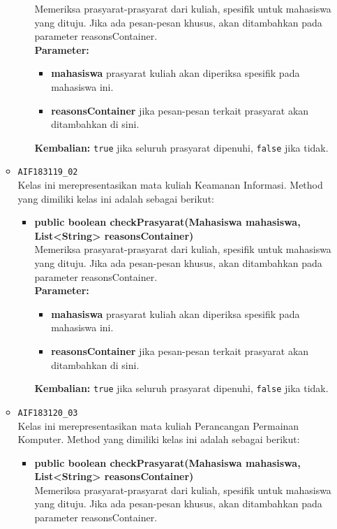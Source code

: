 \begin{enumerate}
\begin{itemize}
\begin{itemize}
			Memeriksa prasyarat-prasyarat dari kuliah, spesifik untuk mahasiswa yang dituju. Jika ada pesan-pesan khusus, akan ditambahkan pada parameter reasonsContainer.\\
			\textbf{Parameter:}
			\begin{itemize}
				\item \textbf{mahasiswa} prasyarat kuliah akan diperiksa spesifik pada mahasiswa ini.
				\item \textbf{reasonsContainer} jika pesan-pesan terkait prasyarat akan ditambahkan di sini.
			\end{itemize}
			\textbf{Kembalian:} \texttt{true} jika seluruh prasyarat dipenuhi, \texttt{false} jika tidak.
		\end{itemize}
		\item \texttt{AIF183119\_02} \\
		Kelas ini merepresentasikan mata kuliah Keamanan Informasi. Method yang dimiliki kelas ini adalah sebagai berikut: 
		\begin{itemize}
			\item \textbf{public boolean checkPrasyarat(Mahasiswa mahasiswa, List<String> reasonsContainer)}\\
			Memeriksa prasyarat-prasyarat dari kuliah, spesifik untuk mahasiswa yang dituju. Jika ada pesan-pesan khusus, akan ditambahkan pada parameter reasonsContainer.\\
			\textbf{Parameter:}
			\begin{itemize}
				\item \textbf{mahasiswa} prasyarat kuliah akan diperiksa spesifik pada mahasiswa ini.
				\item \textbf{reasonsContainer} jika pesan-pesan terkait prasyarat akan ditambahkan di sini.
			\end{itemize}
			\textbf{Kembalian:} \texttt{true} jika seluruh prasyarat dipenuhi, \texttt{false} jika tidak.
		\end{itemize}
		\item \texttt{AIF183120\_03} \\
		Kelas ini merepresentasikan mata kuliah Perancangan Permainan Komputer. Method yang dimiliki kelas ini adalah sebagai berikut: 
		\begin{itemize}
			\item \textbf{public boolean checkPrasyarat(Mahasiswa mahasiswa, List<String> reasonsContainer)}\\
			Memeriksa prasyarat-prasyarat dari kuliah, spesifik untuk mahasiswa yang dituju. Jika ada pesan-pesan khusus, akan ditambahkan pada parameter reasonsContainer.\\

\end{itemize}
\end{itemize}
\end{enumerate}
